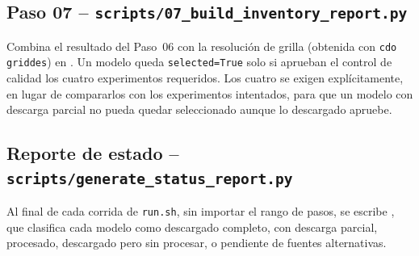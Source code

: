 \subsection{Paso 07 -- \texttt{scripts/07\_build\_inventory\_report.py}}
Combina el resultado del Paso~06 con la resolución de grilla (obtenida con \texttt{cdo griddes}) en . Un modelo queda \texttt{selected=True} solo si aprueban el control de calidad los cuatro experimentos requeridos. Los cuatro se exigen explícitamente, en lugar de compararlos con los experimentos intentados, para que un modelo con descarga parcial no pueda quedar seleccionado aunque lo descargado apruebe.

\subsection{Reporte de estado -- \texttt{scripts/generate\_status\_report.py}}
Al final de cada corrida de \texttt{run.sh}, sin importar el rango de pasos, se escribe , que clasifica cada modelo como descargado completo, con descarga parcial, procesado, descargado pero sin procesar, o pendiente de fuentes alternativas.
